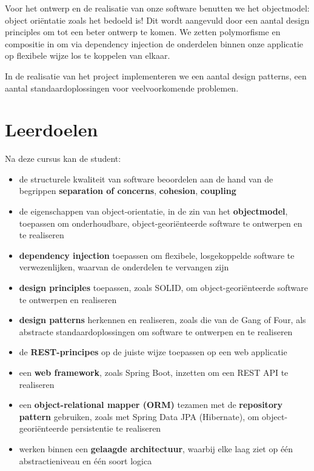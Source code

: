 Voor het ontwerp en de realisatie van onze software benutten we 
het objectmodel: object oriëntatie zoals het bedoeld is! 
Dit wordt aangevuld door een aantal design principles om tot een 
beter ontwerp te komen. We zetten polymorfisme en compositie in 
om via dependency injection de onderdelen binnen onze applicatie 
op flexibele wijze los te koppelen van elkaar.

In de realisatie van het project implementeren we een aantal
design patterns, een aantal standaardoplossingen voor 
veelvoorkomende problemen.

\newpage
\section{Leerdoelen}
Na deze cursus kan de student:
\begin{itemize}
    \item de structurele kwaliteit van software beoordelen aan de hand van de begrippen \textbf{separation of concerns}, \textbf{cohesion}, \textbf{coupling}
    \item de eigenschappen van object-orientatie, in de zin van het \textbf{objectmodel}, toepassen om onderhoudbare, object-georiënteerde software te ontwerpen en te realiseren
    \item \textbf{dependency injection} toepassen om flexibele, losgekoppelde software te verwezenlijken, waarvan de onderdelen te vervangen zijn
    \item \textbf{design principles} toepassen, zoals SOLID, om object-georiënteerde software te ontwerpen en realiseren
    \item \textbf{design patterns} herkennen en realiseren, zoals die van de Gang of Four, als abstracte standaardoplossingen om software te ontwerpen en te realiseren
    \item de \textbf{REST-principes} op de juiste wijze toepassen op een web applicatie
    \item een \textbf{web framework}, zoals Spring Boot, inzetten om een REST API te realiseren
    \item een \textbf{object-relational mapper (ORM)} tezamen met de \textbf{repository pattern} gebruiken, zoals met Spring Data JPA (Hibernate), om object-georiënteerde persistentie te realiseren
    \item werken binnen een \textbf{gelaagde architectuur}, waarbij elke laag ziet op één abstractieniveau en één soort logica
\end{itemize}


